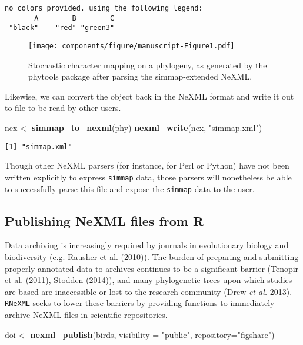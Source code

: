 \documentclass[author-year, review, 11pt]{components/elsarticle} %
\makeatletter
\newenvironment{Shaded}{\begin{snugshade}}{\end{snugshade}}
\newcommand{\KeywordTok}[1]{\textcolor[rgb]{0.13,0.29,0.53}{\textbf{{#1}}}}
\newcommand{\DataTypeTok}[1]{\textcolor[rgb]{0.13,0.29,0.53}{{#1}}}
\newcommand{\StringTok}[1]{\textcolor[rgb]{0.31,0.60,0.02}{{#1}}}
\newcommand{\NormalTok}[1]{{#1}}
\def\maxwidth{\ifdim\Gin@nat@width>\linewidth\linewidth
\else\Gin@nat@width\fi}
\let\Oldincludegraphics\includegraphics
\renewcommand{\includegraphics}[1]{\Oldincludegraphics[width=\maxwidth]{#1}}
\makeatother
\begin{document}
\begin{verbatim}
no colors provided. using the following legend:
       A        B        C 
 "black"    "red" "green3" 
\end{verbatim}

\begin{figure}[htbp]
\centering
\texttt{[image: components/figure/manuscript-Figure1.pdf]}
\caption{Stochastic character mapping on a phylogeny, as generated by
the phytools package after parsing the simmap-extended NeXML.}
\end{figure}

Likewise, we can convert the object back in the NeXML format and write
it out to file to be read by other users.

\begin{Shaded}
\begin{Highlighting}[]
\NormalTok{nex <-}\StringTok{ }\KeywordTok{simmap_to_nexml}\NormalTok{(phy) }
\KeywordTok{nexml_write}\NormalTok{(nex, }\StringTok{"simmap.xml"}\NormalTok{)}
\end{Highlighting}
\end{Shaded}

\begin{verbatim}
[1] "simmap.xml"
\end{verbatim}

Though other NeXML parsers (for instance, for Perl or Python) have not
been written explicitly to express \texttt{simmap} data, those parsers
will nonetheless be able to successfully parse this file and expose the
\texttt{simmap} data to the user.

\subsection{Publishing NeXML files from
R}\label{publishing-nexml-files-from-r}

Data archiving is increasingly required by journals in evolutionary
biology and biodiversity (e.g. Rausher et al. (2010)). The burden of
preparing and submitting properly annotated data to archives continues
to be a significant barrier (Tenopir et al. (2011), Stodden (2014)), and
many phylogenetic trees upon which studies are based are inaccessible or
lost to the research community (Drew \emph{et al.} 2013).
\texttt{RNeXML} seeks to lower these barriers by providing functions to
immediately archive NeXML files in scientific repositories.

\begin{Shaded}
\begin{Highlighting}[]
\NormalTok{doi <-}\StringTok{ }\KeywordTok{nexml_publish}\NormalTok{(birds, }\DataTypeTok{visibility =} \StringTok{"public"}\NormalTok{, }\DataTypeTok{repository=}\StringTok{"figshare"}\NormalTok{)}
\end{Highlighting}
\end{Shaded}
\end{document}
